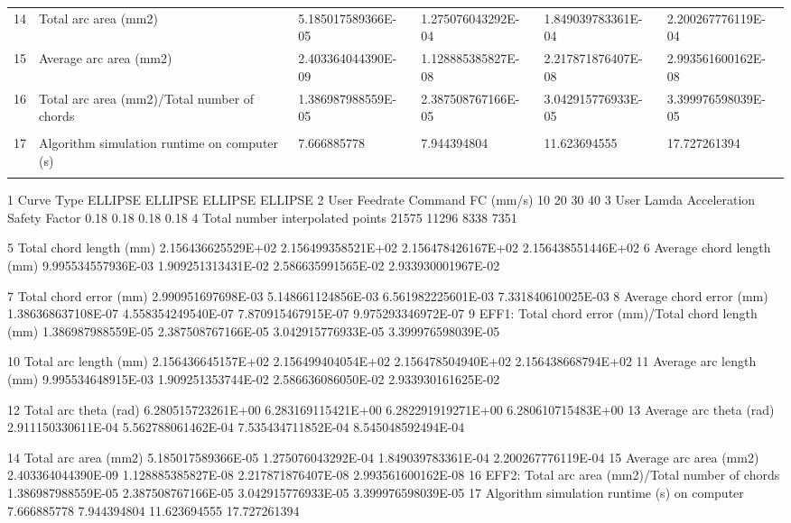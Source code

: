 \begin{tabular}{ p{0.5cm} p{8.0cm} p{4.00cm} p{4.0cm} p{4.00cm} p{4.0cm}}
14	& Total arc area (mm2)	                               & 5.185017589366E-05	& 1.275076043292E-04   & 1.849039783361E-04	& 2.200267776119E-04 \\
15	& Average arc area (mm2)	                           & 2.403364044390E-09	& 1.128885385827E-08   & 2.217871876407E-08	& 2.993561600162E-08 \\
16	& Total arc area (mm2)/Total number of chords	       & 1.386987988559E-05	& 2.387508767166E-05   & 3.042915776933E-05	& 3.399976598039E-05 \\
	&                                                      &                    &                      &                    & \\
17	& Algorithm simulation runtime on computer (s)         & 7.666885778	    & 7.944394804	       & 11.623694555	    & 17.727261394 \\
	&                                                      &                    &                      &                    & 
\end{tabular}


1	Curve Type	ELLIPSE	ELLIPSE	ELLIPSE	ELLIPSE
2	User Feedrate Command FC (mm/s)	10	20	30	40
3	User Lamda Acceleration Safety Factor	0.18	0.18	0.18	0.18
4	Total number interpolated points	21575	11296	8338	7351

5	Total chord length (mm)	    2.156436625529E+02	2.156499358521E+02	2.156478426167E+02	2.156438551446E+02
6	Average chord length (mm)	9.995534557936E-03	1.909251313431E-02	2.586635991565E-02	2.933930001967E-02

7	Total chord error (mm)	    2.990951697698E-03	5.148661124856E-03	6.561982225601E-03	7.331840610025E-03
8	Average chord error (mm)	1.386368637108E-07	4.558354249540E-07	7.870915467915E-07	9.975293346972E-07
9	EFF1: Total chord error (mm)/Total chord length (mm) 	1.386987988559E-05	2.387508767166E-05	3.042915776933E-05	3.399976598039E-05

10	Total arc length (mm)	2.156436645157E+02	2.156499404054E+02	2.156478504940E+02	2.156438668794E+02
11	Average arc length (mm)	9.995534648915E-03	1.909251353744E-02	2.586636086050E-02	2.933930161625E-02

12	Total arc theta (rad)	6.280515723261E+00	6.283169115421E+00	6.282291919271E+00	6.280610715483E+00
13	Average arc theta (rad)	2.911150330611E-04	5.562788061462E-04	7.535434711852E-04	8.545048592494E-04

14	Total arc area (mm2)	5.185017589366E-05	1.275076043292E-04	1.849039783361E-04	2.200267776119E-04
15	Average arc area (mm2)	2.403364044390E-09	1.128885385827E-08	2.217871876407E-08	2.993561600162E-08
16	EFF2: Total arc area (mm2)/Total number of chords	1.386987988559E-05	2.387508767166E-05	3.042915776933E-05	3.399976598039E-05
17	Algorithm simulation runtime (s) on computer	7.666885778	7.944394804	11.623694555	17.727261394

